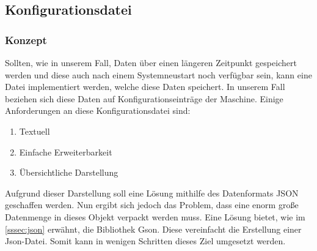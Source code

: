 \subsection{Konfigurationsdatei}\label{subsec:konfiguration}
\subsubsection{Konzept}
Sollten, wie in unserem Fall, Daten über einen längeren Zeitpunkt gespeichert werden und diese auch nach einem Systemneustart noch verfügbar sein, kann eine Datei implementiert werden, welche diese Daten speichert.
In unserem Fall beziehen sich diese Daten auf Konfigurationseinträge der Maschine.
Einige Anforderungen an diese Konfigurationsdatei sind:
\begin{enumerate}
\item Textuell
\item Einfache Erweiterbarkeit
\item Übersichtliche Darstellung
\end{enumerate}
Aufgrund dieser Darstellung soll eine Lösung mithilfe des Datenformats JSON geschaffen werden.
Nun ergibt sich jedoch das Problem, dass eine enorm große Datenmenge in dieses Objekt verpackt werden muss.
Eine Lösung bietet, wie im \autoref{sssec:json} erwähnt, die Bibliothek Gson.
Diese vereinfacht die Erstellung einer Json-Datei.
Somit kann in wenigen Schritten dieses Ziel umgesetzt werden.
